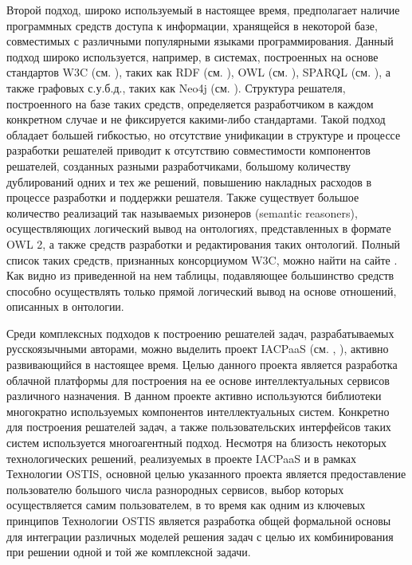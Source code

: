 Второй подход, широко используемый в настоящее время, предполагает наличие программных средств доступа к информации, хранящейся в некоторой базе, совместимых с различными популярными языками программирования. Данный подход широко используется, например, в системах, построенных на основе стандартов W3C (см. ), таких как RDF (см. ), OWL (см. ), SPARQL (см. ), а также графовых с.у.б.д., таких как Neo4j (см. ). Структура решателя, построенного на базе таких средств, определяется разработчиком в каждом конкретном случае и не фиксируется какими-либо стандартами. Такой подход обладает большей гибкостью, но отсутствие унификации в структуре и процессе разработки решателей приводит к отсутствию совместимости компонентов решателей, созданных разными разработчиками, большому количеству дублирований одних и тех же решений, повышению накладных расходов в процессе разработки и поддержки решателя. Также существует большое количество реализаций так называемых ризонеров (semantic reasoners), осуществляющих логический вывод на онтологиях, представленных в формате OWL 2, а также средств разработки и редактирования таких онтологий. Полный список таких средств, признанных консорциумом W3C, можно найти на сайте . Как видно из приведенной на нем таблицы, подавляющее большинство средств способно осуществлять только прямой логический вывод на основе отношений, описанных в онтологии.

Среди комплексных подходов к построению решателей задач, разрабатываемых русскоязычными авторами, можно выделить проект IACPaaS (см. ,  ), активно развивающийся в настоящее время. Целью данного проекта является разработка облачной платформы для построения на ее основе интеллектуальных сервисов различного назначения. В данном проекте активно используются библиотеки многократно используемых компонентов интеллектуальных систем. Конкретно для построения решателей задач, а также пользовательских интерфейсов таких систем используется многоагентный подход. Несмотря на близость некоторых технологических решений, реализуемых в проекте IACPaaS и в рамках Технологии OSTIS, основной целью указанного проекта является предоставление пользователю большого числа разнородных сервисов, выбор которых осуществляется самим пользователем, в то время как одним из ключевых принципов Технологии OSTIS является разработка общей формальной основы для интеграции различных моделей решения задач с целью их комбинирования при решении одной и той же комплексной задачи.

